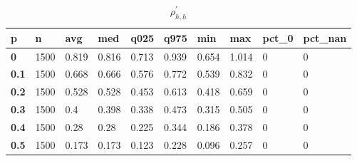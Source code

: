 \begin{table}[h]
 \centering 
\footnotesize
\caption{$\rho_{h,h}^\prime $}
\label{tab:alphahh}
\begin{tabular}[h]{|l|l|l|l|l|l|l|l|l|l|
    } \hline
\textbf{ p} & \textbf{ n} & \textbf{ avg} & \textbf{ med} & \textbf{ q025} & \textbf{ q975} & \textbf{ min} & \textbf{ max} & \textbf{ pct\_0} & \textbf{ pct\_nan}
    \\ \hline
  \textbf{  0} & 1500 & 0.819 & 0.816 & 0.713 & 0.939 & 0.654 & 1.014 & 0 & 0
    \\ \hline
  \textbf{0.1} & 1500 & 0.668 & 0.666 & 0.576 & 0.772 & 0.539 & 0.832 & 0 & 0
    \\ \hline
  \textbf{0.2} & 1500 & 0.528 & 0.528 & 0.453 & 0.613 & 0.418 & 0.659 & 0 & 0
    \\ \hline
  \textbf{0.3} & 1500 &   0.4 & 0.398 & 0.338 & 0.473 & 0.315 & 0.505 & 0 & 0
    \\ \hline
  \textbf{0.4} & 1500 &  0.28 &  0.28 & 0.225 & 0.344 & 0.186 & 0.378 & 0 & 0
    \\ \hline
  \textbf{0.5} & 1500 & 0.173 & 0.173 & 0.123 & 0.228 & 0.096 & 0.257 & 0 & 0
    \\ \hline
 \end{tabular}
 \end{table}
